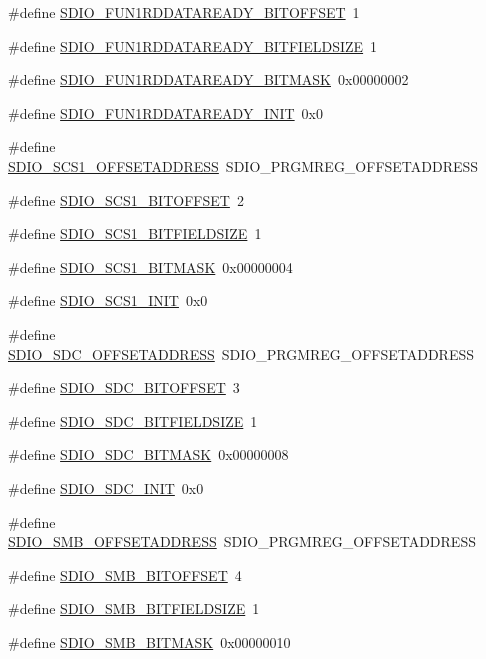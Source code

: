 \begin{DoxyCompactItemize}
\item 
\#define \hyperlink{a00571_a67a061b260c53d301a61077f0bc4a295}{SDIO\_\-FUN1RDDATAREADY\_\-BITOFFSET}~1
\item 
\#define \hyperlink{a00571_ab8dd8e85c30f2039b0435876d740db90}{SDIO\_\-FUN1RDDATAREADY\_\-BITFIELDSIZE}~1
\item 
\#define \hyperlink{a00571_a1fa40fc0a57ae43b5dbc8a4358d87b78}{SDIO\_\-FUN1RDDATAREADY\_\-BITMASK}~0x00000002
\item 
\#define \hyperlink{a00571_abab334293304b473679fb071a1dd94be}{SDIO\_\-FUN1RDDATAREADY\_\-INIT}~0x0
\item 
\#define \hyperlink{a00571_a6736f75e58b215040910efd6c9e46415}{SDIO\_\-SCS1\_\-OFFSETADDRESS}~SDIO\_\-PRGMREG\_\-OFFSETADDRESS
\item 
\#define \hyperlink{a00571_ad442b5bcd7a0badb3ca5b6df13458012}{SDIO\_\-SCS1\_\-BITOFFSET}~2
\item 
\#define \hyperlink{a00571_a12a30066dd27924c8a01aeb2cc3b44ab}{SDIO\_\-SCS1\_\-BITFIELDSIZE}~1
\item 
\#define \hyperlink{a00571_a3a5543cd81bbaabaa0efa1106a700e70}{SDIO\_\-SCS1\_\-BITMASK}~0x00000004
\item 
\#define \hyperlink{a00571_affb572018ceabbfb90a5ad8c0b927476}{SDIO\_\-SCS1\_\-INIT}~0x0
\item 
\#define \hyperlink{a00571_abf27b5f57081a6b1d0b7baa03a359fb0}{SDIO\_\-SDC\_\-OFFSETADDRESS}~SDIO\_\-PRGMREG\_\-OFFSETADDRESS
\item 
\#define \hyperlink{a00571_a7f338e587b5448250d3abf885b1ac294}{SDIO\_\-SDC\_\-BITOFFSET}~3
\item 
\#define \hyperlink{a00571_a46441513d415503010ae841b5ddd61f9}{SDIO\_\-SDC\_\-BITFIELDSIZE}~1
\item 
\#define \hyperlink{a00571_aa0afcd407d0c6c147d239f3586ca94cd}{SDIO\_\-SDC\_\-BITMASK}~0x00000008
\item 
\#define \hyperlink{a00571_ab3e84c908938ed7b49eb458abfa7a680}{SDIO\_\-SDC\_\-INIT}~0x0
\item 
\#define \hyperlink{a00571_a0c0f39e2e7828046fff76a257acaf8f8}{SDIO\_\-SMB\_\-OFFSETADDRESS}~SDIO\_\-PRGMREG\_\-OFFSETADDRESS
\item 
\#define \hyperlink{a00571_ac2bd69887aec12c4d09bb1ec56645cad}{SDIO\_\-SMB\_\-BITOFFSET}~4
\item 
\#define \hyperlink{a00571_a274925ca769d4a3a2cd97f33d2bbef07}{SDIO\_\-SMB\_\-BITFIELDSIZE}~1
\item 
\#define \hyperlink{a00571_a1e83baee21564e4a24a51bf61c25ca0b}{SDIO\_\-SMB\_\-BITMASK}~0x00000010

\end{DoxyCompactItemize}
